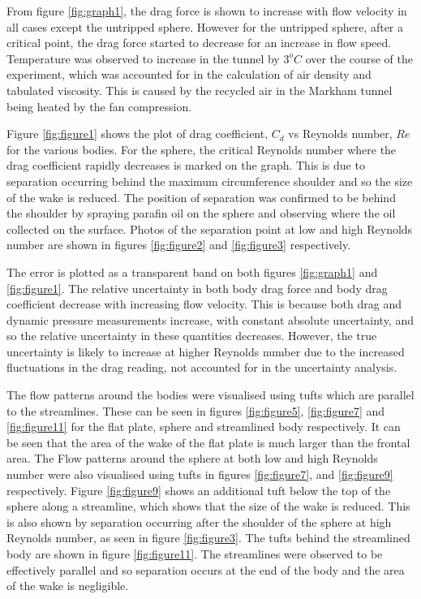 \documentclass[8pt]{article}
\begin{document}

From figure \ref{fig:graph1}, the drag force is shown to increase with flow velocity in all cases except the untripped sphere.
However for the untripped sphere, after a critical point, the drag force started to decrease for an increase in flow speed.
Temperature was observed to increase in the tunnel by $3^oC$ over the course of the experiment, which was accounted for in the calculation of air density and tabulated viscosity.
This is caused by the recycled air in the Markham tunnel being heated by the fan compression.

Figure \ref{fig:figure1} shows the plot of drag coefficient, $C_d$ vs Reynolds number, $Re$ for the various bodies. 
For the sphere, the critical Reynolds number where the drag coefficient rapidly decreases is marked on the graph.
This is due to separation occurring behind the maximum circumference shoulder and so the size of the wake is reduced.
The position of separation was confirmed to be behind the shoulder by spraying parafin oil on the sphere and observing where the oil collected on the surface.
Photos of the separation point at low and high Reynolds number are shown in figures \ref{fig:figure2} and \ref{fig:figure3} respectively.

The error is plotted as a transparent band on both figures \ref{fig:graph1} and \ref{fig:figure1}.
The relative uncertainty in both body drag force and body drag coefficient decrease with increasing flow velocity.
This is because both drag and dynamic pressure measurements increase, with constant absolute uncertainty, and so the relative uncertainty in these quantities decreases.
However, the true uncertainty is likely to increase at higher Reynolds number due to the increased fluctuations in the drag reading, not accounted for in the uncertainty analysis.

\newpage




The flow patterns around the bodies were visualised using tufts which are parallel to the streamlines.
These can be seen in figures \ref{fig:figure5}, \ref{fig:figure7} and \ref{fig:figure11} for the flat plate, sphere and streamlined body respectively.
It can be seen that the area of the wake of the flat plate is much larger than the frontal area.
The Flow patterns around the sphere at both low and high Reynolds number were also visualised using tufts in figures \ref{fig:figure7}, and \ref{fig:figure9} respectively.
Figure \ref{fig:figure9} shows an additional tuft below the top of the sphere along a streamline, which shows that the size of the wake is reduced.
This is also shown by separation occurring after the shoulder of the sphere at high Reynolds number, as seen in figure \ref{fig:figure3}.
The tufts behind the streamlined body are shown in figure \ref{fig:figure11}. The streamlines were observed to be effectively parallel and so separation occurs at the end of the body and the area of the wake is negligible.
\end{document}
